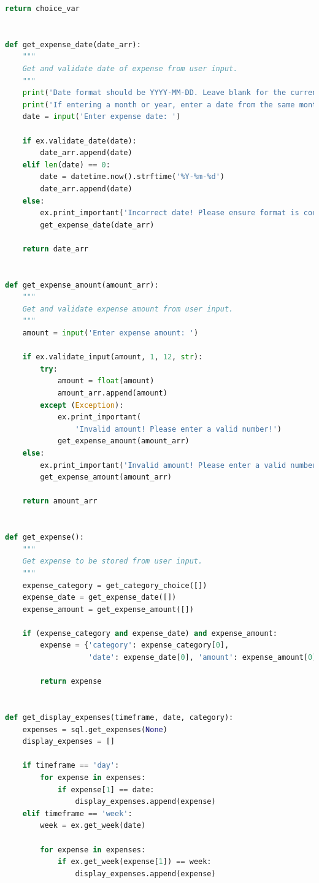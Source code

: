 \documentclass[11pt]{article}
\begin{document}
\begin{lstlisting}[language=Python, caption=Source code for \textit{expcli.py}.]
    return choice_var


def get_expense_date(date_arr):
    """
    Get and validate date of expense from user input.
    """
    print('Date format should be YYYY-MM-DD. Leave blank for the current day. ')
    print('If entering a month or year, enter a date from the same month or year.')
    date = input('Enter expense date: ')

    if ex.validate_date(date):
        date_arr.append(date)
    elif len(date) == 0:
        date = datetime.now().strftime('%Y-%m-%d')
        date_arr.append(date)
    else:
        ex.print_important('Incorrect date! Please ensure format is correct!')
        get_expense_date(date_arr)

    return date_arr


def get_expense_amount(amount_arr):
    """
    Get and validate expense amount from user input.
    """
    amount = input('Enter expense amount: ')

    if ex.validate_input(amount, 1, 12, str):
        try:
            amount = float(amount)
            amount_arr.append(amount)
        except (Exception):
            ex.print_important(
                'Invalid amount! Please enter a valid number!')
            get_expense_amount(amount_arr)
    else:
        ex.print_important('Invalid amount! Please enter a valid number!')
        get_expense_amount(amount_arr)

    return amount_arr


def get_expense():
    """
    Get expense to be stored from user input.
    """
    expense_category = get_category_choice([])
    expense_date = get_expense_date([])
    expense_amount = get_expense_amount([])

    if (expense_category and expense_date) and expense_amount:
        expense = {'category': expense_category[0],
                   'date': expense_date[0], 'amount': expense_amount[0]}

        return expense


def get_display_expenses(timeframe, date, category):
    expenses = sql.get_expenses(None)
    display_expenses = []

    if timeframe == 'day':
        for expense in expenses:
            if expense[1] == date:
                display_expenses.append(expense)
    elif timeframe == 'week':
        week = ex.get_week(date)

        for expense in expenses:
            if ex.get_week(expense[1]) == week:
                display_expenses.append(expense)


\end{lstlisting}
\end{document}
